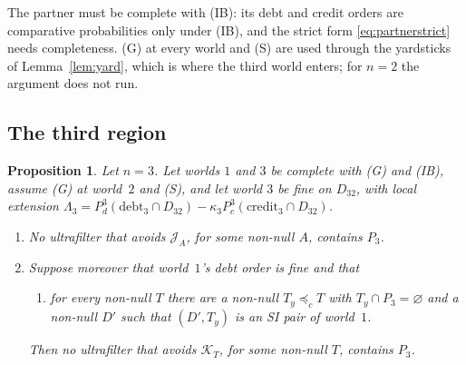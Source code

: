 \documentclass[11pt]{article}
\newtheorem{proposition}[theorem]{Proposition}
\theoremstyle{definition}\newtheorem{definition}[theorem]{Definition}
\theoremstyle{remark}\newtheorem{remark}[theorem]{Remark}
\newcommand{\debt}{\mathrm{debt}}
\newcommand{\cred}{\mathrm{credit}}
\newcommand{\Jid}{\mathcal J}
\newcommand{\Kid}{\mathcal K}
\begin{document}
\noindent The partner must be complete with (IB): its debt and credit
orders are comparative probabilities only under (IB), and the strict form
\eqref{eq:partnerstrict} needs completeness. (G) at every world and (S) are
used through the yardsticks of Lemma~\ref{lem:yard}, which is where the third
world enters; for $n=2$ the argument does not run.

\subsection{The third region}

\begin{proposition}\label{prop:third}
Let $n=3$. Let worlds $1$ and $3$ be complete with (G) and (IB), assume (G)
at world~$2$ and (S), and let world $3$ be fine on $D_{32}$, with local
extension $\Lambda_3=P^3_d(\debt_3\cap D_{32})-\kappa_3P^3_c(\cred_3\cap
D_{32})$.
\begin{enumerate}[label=(\alph*)]
\item No ultrafilter that avoids $\Jid_A$, for some non-null $A$, contains
$P_3$.
\item Suppose moreover that world~$1$'s debt order is fine and that
\begin{enumerate}[label=(H$_{\mathrm{SI}}$),leftmargin=*]
\item for every non-null $T$ there are a non-null $T_y\preceq_cT$ with
$T_y\cap P_3=\varnothing$ and a non-null $D'$ such that $(D',T_y)$ is
an SI pair of world~$1$.
\end{enumerate}
Then no ultrafilter that avoids $\Kid_T$, for some non-null $T$, contains
$P_3$.
\end{enumerate}
\end{proposition}
\end{document}
